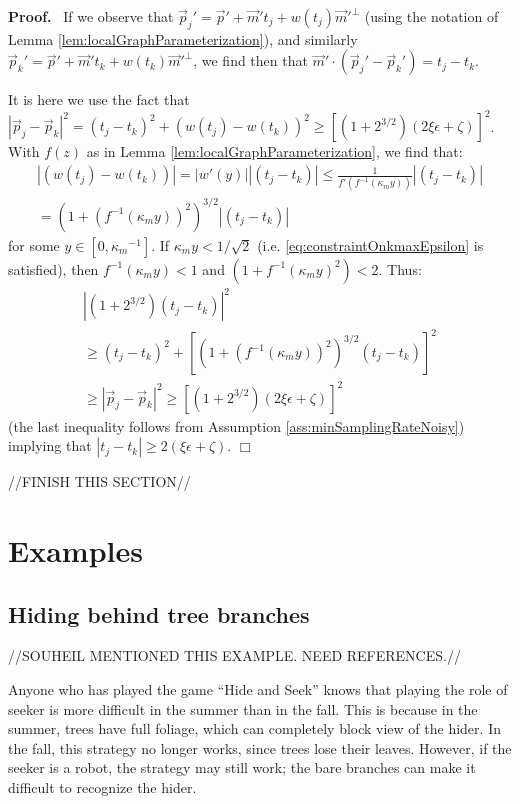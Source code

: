 \documentclass{article}
\newenvironment{proof}{
  \noindent\textbf{Proof.}\ }{\hspace*{\fill}
  \begin{math}\Box\end{math}\medskip}
\numberwithin{cntr}{section}
\numberwithin{equation}{section}
\newcommand{\abs}[1]{\left| #1 \right|}%
\newcommand{\vp}[0]{{\vec{p}}}
\newcommand{\vm}[0]{{\vec{m}}}
\newcommand{\curvemax}{{\kappa_{m}}}
\newcommand{\curvemaxi}{{\curvemax^{-1}}}
\newcommand{\pointNoise}{{\zeta}}
\newcommand{\tanNoise}{{\xi}}
\begin{document}
\begin{proof}
If we observe that $\vp_{j}' = \vp' + \vm' t_{j} + w(t_{j}) \vm'^{\perp}$ (using the notation of Lemma \ref{lem:localGraphParameterization}), and similarly $\vp_{k}' = \vp' + \vm' t_{k} + w(t_{k}) \vm'^{\perp}$, we find then that $\vm' \cdot (\vp_{j}'-\vp_{k}') = t_{j}-t_{k}$.

It is here we use the fact that $\abs{\vp_{j} - \vp_{k}}^{2} = (t_{j}-t_{k})^{2} + (w(t_{j})-w(t_{k}))^{2} \geq [(1+2^{3/2})(2 \tanNoise \epsilon + \pointNoise)]^{2}$. With $f(z)$ as in Lemma \ref{lem:localGraphParameterization}, we find that:
\begin{multline*}
  \abs{(w(t_{j})-w(t_{k}))} = \abs{w'(y)}\abs{(t_{j}-t_{k})} \leq \frac{1}{f'(f^{-1}(\curvemax y))} \abs{(t_{j}-t_{k})} \\
  = (1+(f^{-1}(\curvemax y))^{2})^{3/2} \abs{(t_{j}-t_{k} )}
\end{multline*}
for some $y \in [0,\curvemaxi]$. If $\curvemax y < 1/\sqrt{2}$ (i.e. \eqref{eq:constraintOnkmaxEpsilon} is satisfied), then $f^{-1}(\curvemax y) < 1$ and $(1+f^{-1}(\curvemax y)^{2}) < 2$. Thus:
\begin{multline}
  \abs{(1+2^{3/2})(t_{j}-t_{k})}^{2} \\
  \geq (t_{j}-t_{k})^{2} + [(1+(f^{-1}(\curvemax y))^{2})^{3/2} (t_{j}-t_{k} )]^{2} \\
  \geq \abs{\vp_{j} - \vp_{k}}^{2}  \geq [(1+2^{3/2})(2 \tanNoise \epsilon + \pointNoise)]^{2}
\end{multline}
(the last inequality follows from Assumption \ref{ass:minSamplingRateNoisy}) implying that $\abs{t_{j}-t_{k}} \geq 2(\tanNoise \epsilon + \pointNoise)$.
\end{proof}


//FINISH THIS SECTION//

\section{Examples}

\subsection{Hiding behind tree branches}

//SOUHEIL MENTIONED THIS EXAMPLE. NEED REFERENCES.//

Anyone who has played the game ``Hide and Seek'' knows that playing the role of seeker is more difficult in the summer than in the fall. This is because in the summer, trees have full foliage, which can completely block view of the hider. In the fall, this strategy no longer works, since trees lose their leaves. However, if the seeker is a robot, the strategy may still work; the bare branches can make it difficult to recognize the hider.
\end{document}
